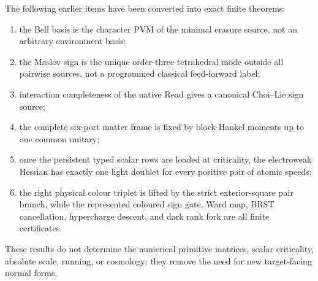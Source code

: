 \documentclass[11pt,oneside,openany]{book}
\numberwithin{equation}{chapter}
\theoremstyle{definition}
\theoremstyle{remark}
\begin{document}
The following earlier items have been converted into exact finite theorems:
\begin{enumerate}[label=\textup{(\roman*)},leftmargin=2.5em]
\item the Bell basis is the character PVM of the minimal erasure source, not
      an arbitrary environment basis;
\item the Maslov sign is the unique order-three tetrahedral mode outside all
      pairwise sources, not a programmed classical feed-forward label;
\item interaction completeness of the native Read gives a canonical
      Choi--Lie sign source;
\item the complete six-port matter frame is fixed by block-Hankel moments up
      to one common unitary;
\item once the persistent typed scalar rows are loaded at criticality, the
      electroweak Hessian has exactly one light doublet for every positive
      pair of atomic speeds;
\item the right physical colour triplet is lifted by the strict
      exterior-square pair branch, while the represented coloured sign gate,
      Ward map, BRST cancellation, hypercharge descent, and dark rank fork are
      all finite certificates.
\end{enumerate}
These results do not determine the numerical primitive matrices, scalar
criticality, absolute scale, running, or cosmology; they remove the need for
new target-facing normal forms.
\end{document}
